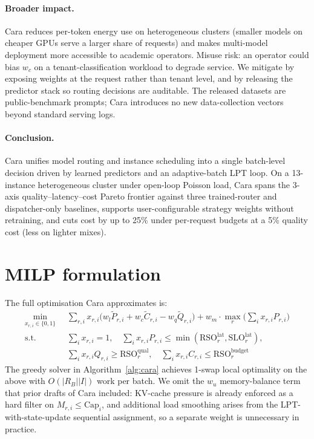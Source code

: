 \documentclass[10pt]{article}
\begin{document}
\paragraph{Broader impact.} Cara reduces per-token energy use on heterogeneous clusters (smaller models on cheaper GPUs serve a larger share of requests) and makes multi-model deployment more accessible to academic operators. Misuse risk: an operator could bias $w_c$ on a tenant-classification workload to degrade service. We mitigate by exposing weights at the request rather than tenant level, and by releasing the predictor stack so routing decisions are auditable. The released datasets are public-benchmark prompts; Cara introduces no new data-collection vectors beyond standard serving logs.

\paragraph{Conclusion.} Cara unifies model routing and instance scheduling into a single batch-level decision driven by learned predictors and an adaptive-batch LPT loop. On a 13-instance heterogeneous cluster under open-loop Poisson load, Cara spans the 3-axis quality–latency–cost Pareto frontier against three trained-router and dispatcher-only baselines, supports user-configurable strategy weights without retraining, and cuts cost by up to 25\% under per-request budgets at a 5\% quality cost (less on lighter mixes).




\appendix

\section{MILP formulation}\label{appendix:milp}
The full optimisation Cara approximates is:
\begin{align*}
\min_{x_{r,i} \in \{0,1\}} \;\; & \sum_{r,i} x_{r,i} \big( w_l \tilde{P}_{r,i} + w_c \tilde{C}_{r,i} - w_q \tilde{Q}_{r,i} \big) + w_m \cdot \max_r \big(\textstyle\sum_i x_{r,i} P_{r,i}\big) \\
\text{s.t.} \;\; & \textstyle\sum_i x_{r,i} = 1, \quad \textstyle\sum_i x_{r,i} P_{r,i} \le \min(\text{RSO}^{\text{lat}}_r, \text{SLO}^{\text{lat}}_r), \\
& \textstyle\sum_i x_{r,i} Q_{r,i} \ge \text{RSO}^{\text{qual}}_r, \quad \textstyle\sum_i x_{r,i} C_{r,i} \le \text{RSO}^{\text{budget}}_r
\end{align*}
The greedy solver in Algorithm~\ref{alg:cara} achieves 1-swap local optimality on the above with $O(|R_B||I|)$ work per batch. We omit the $w_u$ memory-balance term that prior drafts of Cara included: KV-cache pressure is already enforced as a hard filter on $M_{r,i} \le \text{Cap}_i$, and additional load smoothing arises from the LPT-with-state-update sequential assignment, so a separate weight is unnecessary in practice.
\end{document}
